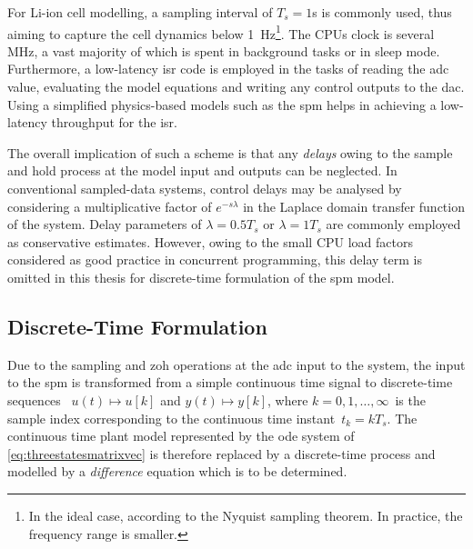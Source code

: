 For  Li-ion  cell  modelling,  a  sampling interval  of  $T_s  =  1$\si{\second}
is   commonly  used,   thus  aiming   to   capture  the   cell  dynamics   below
\SI{1}{\hertz}\footnote{In  the ideal  case, according  to the  Nyquist sampling
theorem.  In practice, the frequency  range is smaller.}. The CPUs clock is
several \si{\MHz}, a vast  majority of which is spent in  background tasks or in
sleep mode. Furthermore,  a low-latency \gls{isr} code is employed  in the tasks
of reading the  \gls{adc} value, evaluating the model equations  and writing any
control outputs to  the \gls{dac}. Using a simplified  physics-based models such
as the \gls{spm} helps in achieving a low-latency throughput for the \gls{isr}.

The overall implication of such a scheme  is that any \emph{delays} owing to the
sample and  hold process  at the model  input and outputs  can be  neglected. In
conventional sampled-data systems, control delays may be analysed by considering
a multiplicative factor of $e^{-sλ}$ in the Laplace domain transfer function of
the system.  Delay parameters of  $λ = 0.5  T_s$ or $λ  = 1 T_s$  are commonly
employed as conservative estimates. However, owing to the small CPU load factors
considered  as good  practice  in  concurrent programming,  this  delay term  is
omitted in this thesis for discrete-time formulation of the \gls{spm} model.


\subsection{Discrete-Time  Formulation}


Due  to the  sampling and  \gls{zoh} operations  at the  \gls{adc} input  to the
system,  the input  to the  \gls{spm} is  transformed from  a simple  continuous
time signal  to discrete-time  sequences \ie~\mbox{$u(t) \mapsto  u[k]$} and
\mbox{$y(t)  \mapsto  y[k]$}, where  \mbox{$k  =  0,1,\dots,∞$}~is the  sample
index  corresponding  to  the   continuous  time  instant~\mbox{$t_k  =  kT_s$}.
The  continuous  time  plant  model  represented  by  the  \gls{ode}  system  of
\cref{eq:threestatesmatrixvec} is therefore replaced  by a discrete-time process
and modelled by a \emph{difference} equation which is to be determined.


